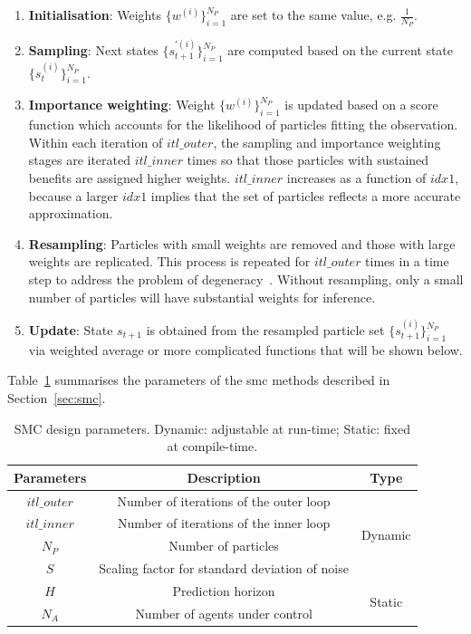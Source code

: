 \begin{enumerate}
\item \textbf{Initialisation}: Weights $\{w^{(i)}\}^{N_P}_{i=1}$ are set to the same value, e.g. $\frac{1}{N_P}$.
\item \textbf{Sampling}: Next states $\{s_{t+1}^{'(i)}\}^{N_P}_{i=1}$ are computed based on the current state $\{s_{t}^{(i)}\}^{N_P}_{i=1}$.
\item \textbf{Importance weighting}: Weight $\{w^{(i)}\}^{N_P}_{i=1}$ is updated based on a score function which accounts for the likelihood of particles fitting the observation.
Within each iteration of $itl\_outer$, the sampling and importance weighting stages are iterated $itl\_inner$ times so that those particles with sustained benefits are assigned higher weights.
$itl\_inner$ increases as a function of $idx1$, because a larger $idx1$ implies that the set of particles reflects a more accurate approximation.
\item \textbf{Resampling}: Particles with small weights are removed and those with large weights are replicated.
This process is repeated for $itl\_outer$ times in a time step to address the problem of degeneracy~\cite{kitagawa96}.
Without resampling, only a small number of particles will have substantial weights for inference.
\item \textbf{Update}: State $s_{t+1}$ is obtained from the resampled particle set $\{s_{t+1}^{(i)}\}^{N_P}_{i=1}$ via weighted average or more complicated functions that will be shown below.
\end{enumerate}

Table~\ref{tab:parameters} summarises the parameters of the \gls{smc} methods described in Section~\ref{sec:smc}.

\begin{table}
	\setlength{\tabcolsep}{3pt}
	\begin{spacing}{1.0}
	\caption{SMC design parameters. Dynamic: adjustable at run-time; Static: fixed at compile-time.}
	\label{tab:parameters}
	\footnotesize
	\centering
	\smallskip
		\begin{tabular}{c|c|c}
			\hline
			 Parameters & Description & Type\\
			\hline
			\hline
			$itl\_outer$ & Number of iterations of the outer loop & \multirow{4}{*}{Dynamic}\\
			$itl\_inner$ & Number of iterations of the inner loop &\\
			$N_P$ & Number of particles &\\
			$S$ & Scaling factor for standard deviation of noise &\\
			\hline
			$H$ & Prediction horizon & \multirow{2}{*}{Static}\\
			$N_A$ & Number of agents under control &\\
			\hline
		\end{tabular}
		\end{spacing}
\end{table}

